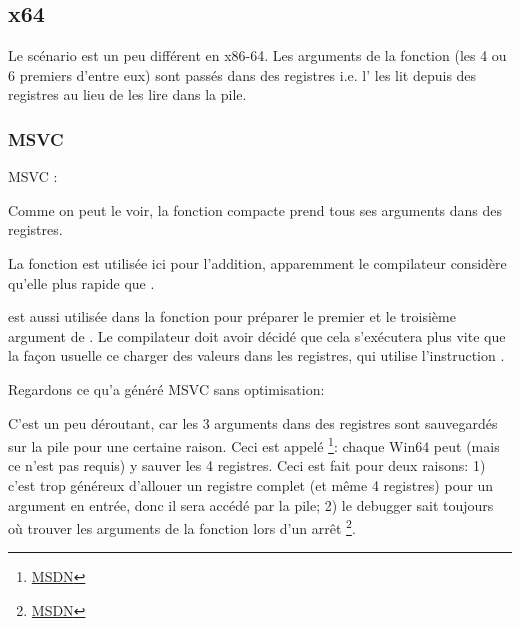\subsection{x64}


Le scénario est un peu différent en x86-64. Les arguments de la fonction (les 4 ou
6 premiers d'entre eux) sont passés dans des registres i.e. l'
les lit depuis des registres au lieu de les lire dans la pile.

\subsubsection{MSVC}

MSVC \Optimizing:



Comme on peut le voir, la fonction compacte \ttf prend tous ses arguments dans des registres.

La fonction \LEA est utilisée ici pour l'addition,
apparemment le compilateur considère qu'elle plus rapide que .

\LEA est aussi utilisée dans la fonction \main pour préparer le premier et le troisième
argument de \ttf. Le compilateur doit avoir décidé que cela s'exécutera plus vite
que la façon usuelle ce charger des valeurs dans les registres, qui utilise l'instruction
\MOV.

Regardons ce qu'a généré MSVC sans optimisation:



C'est un peu déroutant, car les 3 arguments dans des registres sont sauvegardés
sur la pile pour une certaine raison.
\label{shadow_space}
Ceci est appelé  %
\footnote{\href{http://go.yurichev.com/17256}{MSDN}}: 
chaque Win64 peut (mais ce n'est pas requis) y sauver les 4 registres. %
Ceci est fait pour deux raisons:
1) c'est trop généreux d'allouer un registre complet (et même 4 registres) pour
un argument en entrée, donc il sera accédé par la pile;
2) le debugger sait toujours où trouver les arguments de la fonction lors d'un arrêt
\footnote{\href{http://go.yurichev.com/17257}{MSDN}}.

